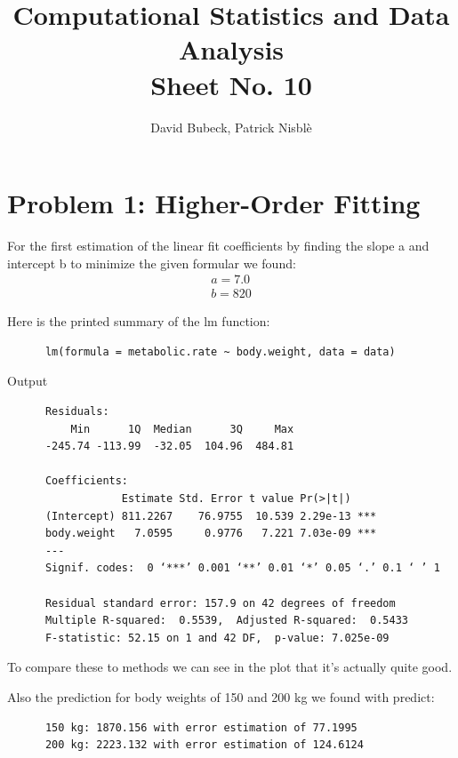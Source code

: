 \documentclass[11pt, a4paper, reqno]{scrartcl}
\begin{document}
    \title{Computational Statistics and Data Analysis\\Sheet No. 10}
    \author{David Bubeck, Patrick Nisbl\`e}
    \maketitle
    \section*{Problem 1: Higher-Order Fitting}

    For the first estimation of the linear fit coefficients by finding the slope a and intercept b to minimize the given formular we found:
    \begin{align*}
      a = 7.0\\
      b = 820
    \end{align*}

    Here is the printed summary of the lm function:

    \begin{verbatim}
      lm(formula = metabolic.rate ~ body.weight, data = data)
    \end{verbatim}

    Output
    \begin{verbatim}
      Residuals:
          Min      1Q  Median      3Q     Max
      -245.74 -113.99  -32.05  104.96  484.81

      Coefficients:
                  Estimate Std. Error t value Pr(>|t|)
      (Intercept) 811.2267    76.9755  10.539 2.29e-13 ***
      body.weight   7.0595     0.9776   7.221 7.03e-09 ***
      ---
      Signif. codes:  0 ‘***’ 0.001 ‘**’ 0.01 ‘*’ 0.05 ‘.’ 0.1 ‘ ’ 1

      Residual standard error: 157.9 on 42 degrees of freedom
      Multiple R-squared:  0.5539,	Adjusted R-squared:  0.5433
      F-statistic: 52.15 on 1 and 42 DF,  p-value: 7.025e-09
    \end{verbatim}

    To compare these to methods we can see in the plot that it's actually quite good.

    Also the prediction for body weights of 150 and 200 kg we found with predict:
    \begin{verbatim}
      150 kg: 1870.156 with error estimation of 77.1995
      200 kg: 2223.132 with error estimation of 124.6124
    \end{verbatim}
\end{document}
